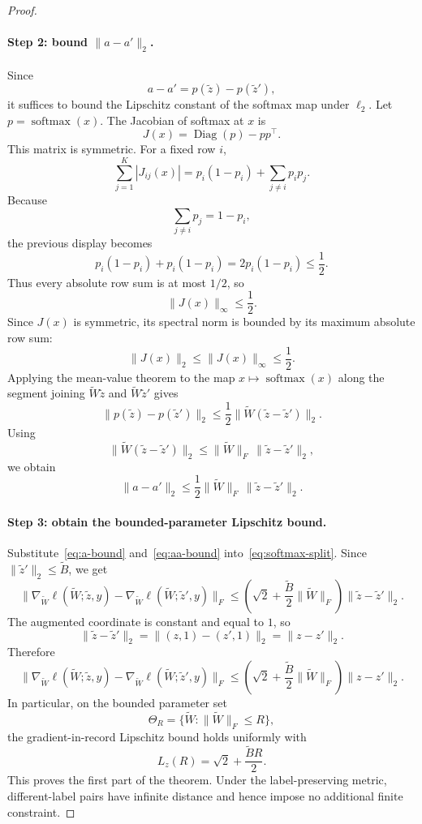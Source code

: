 \documentclass[conference,compsoc]{IEEEtran}
\DeclareMathOperator{\softmax}{softmax}
\begin{document}
\begin{proof}
\paragraph{Step 2: bound $\|a-a'\|_2$.}
Since
\[
a-a'=p(\widetilde z)-p(\widetilde z'),
\]
it suffices to bound the Lipschitz constant of the softmax map under $\ell_2$. Let $p=\softmax(x)$. The Jacobian of softmax at $x$ is
\[
J(x)=\operatorname{Diag}(p)-pp^\top.
\]
This matrix is symmetric. For a fixed row $i$,
\[
\sum_{j=1}^K |J_{ij}(x)|
=
p_i(1-p_i)+\sum_{j\neq i}p_ip_j.
\]
Because
\[
\sum_{j\neq i}p_j=1-p_i,
\]
the previous display becomes
\[
p_i(1-p_i)+p_i(1-p_i)
=
2p_i(1-p_i)
\le
\frac{1}{2}.
\]
Thus every absolute row sum is at most $1/2$, so
\[
\|J(x)\|_\infty\le \frac{1}{2}.
\]
Since $J(x)$ is symmetric, its spectral norm is bounded by its maximum absolute row sum:
\[
\|J(x)\|_2\le \|J(x)\|_\infty\le \frac{1}{2}.
\]
Applying the mean-value theorem to the map $x\mapsto\softmax(x)$ along the segment joining $\widetilde W\widetilde z$ and $\widetilde W\widetilde z'$ gives
\[
\|p(\widetilde z)-p(\widetilde z')\|_2
\le
\frac{1}{2}\|\widetilde W(\widetilde z-\widetilde z')\|_2.
\]
Using
\[
\|\widetilde W(\widetilde z-\widetilde z')\|_2
\le
\|\widetilde W\|_F\,\|\widetilde z-\widetilde z'\|_2,
\]
we obtain
\begin{equation}
\label{eq:aa-bound}
\|a-a'\|_2
\le
\frac{1}{2}\|\widetilde W\|_F\,\|\widetilde z-\widetilde z'\|_2.
\end{equation}

\paragraph{Step 3: obtain the bounded-parameter Lipschitz bound.}
Substitute~\eqref{eq:a-bound} and~\eqref{eq:aa-bound} into~\eqref{eq:softmax-split}. Since $\|\widetilde z'\|_2\le \widetilde B$, we get
\[
\bigl\|
\nabla_{\widetilde W}\ell(\widetilde W;\widetilde z,y)
-
\nabla_{\widetilde W}\ell(\widetilde W;\widetilde z',y)
\bigr\|_F
\le
\left(
\sqrt{2}
+
\frac{\widetilde B}{2}\|\widetilde W\|_F
\right)
\|\widetilde z-\widetilde z'\|_2.
\]
The augmented coordinate is constant and equal to $1$, so
\[
\|\widetilde z-\widetilde z'\|_2
=
\|(z,1)-(z',1)\|_2
=
\|z-z'\|_2.
\]
Therefore
\[
\bigl\|
\nabla_{\widetilde W}\ell(\widetilde W;\widetilde z,y)
-
\nabla_{\widetilde W}\ell(\widetilde W;\widetilde z',y)
\bigr\|_F
\le
\left(
\sqrt{2}
+
\frac{\widetilde B}{2}\|\widetilde W\|_F
\right)
\|z-z'\|_2.
\]
In particular, on the bounded parameter set
\[
\Theta_R
=
\{\widetilde W:\|\widetilde W\|_F\le R\},
\]
the gradient-in-record Lipschitz bound holds uniformly with
\[
L_z(R)
=
\sqrt{2}+\frac{\widetilde B R}{2}.
\]
This proves the first part of the theorem. Under the label-preserving metric, different-label pairs have infinite distance and hence impose no additional finite constraint.


\end{proof}
\end{document}
